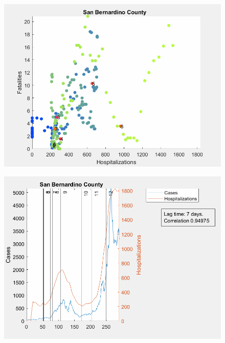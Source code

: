 \documentclass[12pt]{article}
\begin{document}
\begin{figure}[!h]
	\includegraphics[width=\linewidth]{images/san_bernardino_hospitalizations_fatalities_scatter-27lag.png}
	\caption{}
	\label{fig:images/san_bernardino_hospitalizations_fatalities_scatter-27lagLabel}
\end{figure}

\begin{figure}[!h]
	\includegraphics[width=\linewidth]{images/san_bernardino_cases_hospitalizations_line-7lag.png}
	\caption{}
	\label{fig:images/san_bernardino_cases_hospitalizations_line-7lagLabel}
\end{figure}
\end{document}
